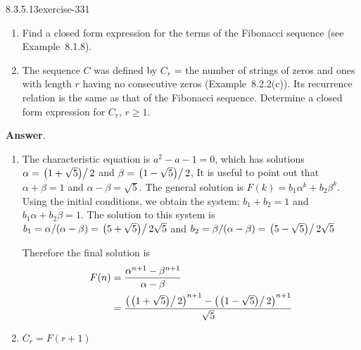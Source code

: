 \documentclass[twoside,10pt,]{book}
\numberwithin{equation}{section}
\begin{document}
\begin{divisionsolution}{8.3.5.13}{}{exercise-331}%
\hypertarget{p-2728}{}%
\leavevmode%
\begin{enumerate}[label=(\alph*)]
\item\hypertarget{li-1348}{}\hypertarget{p-2729}{}%
Find a closed form expression for the terms of the Fibonacci sequence (see Example~8.1.8).%
\item\hypertarget{li-1349}{}\hypertarget{p-2730}{}%
The sequence \(C\) was defined by \(C_r\) = the number of strings of zeros and ones with length \(r\) having no consecutive zeros (Example~8.2.2(c)). Its recurrence relation is the same as that of the Fibonacci sequence. Determine a closed form expression for \(C_r\), \(r \geq  1\).%
\end{enumerate}
%
\par\smallskip%
\noindent\textbf{Answer}.\quad%
\hypertarget{p-2731}{}%
\leavevmode%
\begin{enumerate}[label=(\alph*)]
\item\hypertarget{li-1350}{}\hypertarget{p-2732}{}%
The characteristic equation is \(a^2-a-1=0\), which has solutions \(\alpha =\left.\left(1+\sqrt{5}\right)\right/2\) and \(\beta =\left.\left(1-\sqrt{5}\right)\right/2\), It is useful to point out that \(\alpha +\beta =1\) and \(\alpha -\beta =\sqrt{5}\). The general solution is \(F(k)=b_1\alpha ^k+b_2\beta ^k\). Using the initial conditions, we obtain the system: \(b_1+b_2=1\) and \(b_1\alpha +b_2\beta =1\). The solution to this system is \(b_1=\alpha /(\alpha -\beta )=\left.\left(5+\sqrt{5}\right)\right/2\sqrt{5}\) and  \(b_2=\beta /(\alpha -\beta )=\left.\left(5-\sqrt{5}\right)\right/2\sqrt{5}\)%
\par
\hypertarget{p-2733}{}%
Therefore the final solution is%
\begin{equation*}
\begin{split}
F(n) & = \frac{\alpha^{n+1}-\beta^{n+1}}{\alpha-\beta} \\
& = \frac{\left(\left.\left(1+\sqrt{5}\right)\right/2\right)^{n+1}
-\left(\left.\left(1-\sqrt{5}\right)\right/2\right)^{n+1}}{\sqrt{5}}\\
\end{split}
\end{equation*}
%
\item\hypertarget{li-1351}{}\hypertarget{p-2734}{}%
\(C_r=F(r+1)\)%
\end{enumerate}
%
\end{divisionsolution}%
\end{document}
